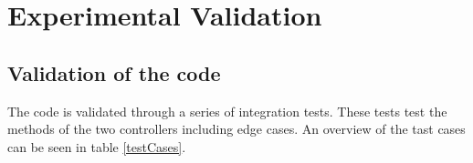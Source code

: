 
\chapter{Experimental Validation} %

\label{Chapter6} %


\section{Validation of the code}
The code is validated through a series of integration tests. These tests test the methods of the two controllers including edge cases. An overview of the tast cases can be seen in table \ref{testCases}.

